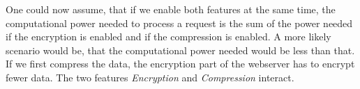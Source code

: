 \documentclass[../../thesis.tex]{subfiles}
\begin{document}
One could now assume, that if we enable both features at the same time, the computational power needed to process a request
is the sum of the power needed if the encryption is enabled and if the compression is enabled.
A more likely scenario would be, that the computational power needed would be less than that.
If we first compress the data, the encryption part of the webserver has to encrypt fewer data.
The two features \textit{Encryption} and \textit{Compression} interact.
\end{document}

